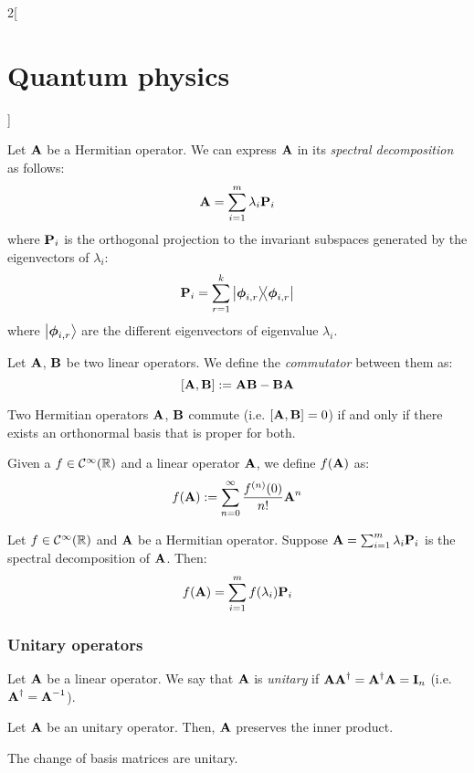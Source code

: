\documentclass[../../../main_physics.tex]{subfiles}
\begin{document}
\begin{multicols}{2}[\section{Quantum physics}]
\begin{definition}
  \end{definition}
  \begin{proposition}
    Let $\boldsymbol{\mathrm{A}}$ be a Hermitian operator. We can express $\boldsymbol{\mathrm{A}}$ in its \emph{spectral decomposition} as follows: $$\boldsymbol{\mathrm{A}}=\sum_{i=1}^m\lambda_i\boldsymbol{\mathrm{P}}_i$$
    where $\boldsymbol{\mathrm{P}}_i$ is the orthogonal projection to the invariant subspaces generated by the eigenvectors of $\lambda_i$: $$\vf{P}_i=\sum_{r=1}^k\dyad{\vf\phi_{i,r}}{\vf\phi_{i,r}}$$
    where $\ket{\boldsymbol{\mathrm{\phi}}_{i,r}}$ are the different eigenvectors of eigenvalue $\lambda_i$.
  \end{proposition}
  \begin{definition}[Commutator]
    Let $\boldsymbol{\mathrm{A}}$, $\boldsymbol{\mathrm{B}}$ be two linear operators. We define the \emph{commutator} between them as: $$[\boldsymbol{\mathrm{A}},\boldsymbol{\mathrm{B}}]:=\boldsymbol{\mathrm{AB}}-\boldsymbol{\mathrm{BA}}$$
  \end{definition}
  \begin{theorem}
    Two Hermitian operators $\boldsymbol{\mathrm{A}}$, $\boldsymbol{\mathrm{B}}$ commute (i.e. $[\boldsymbol{\mathrm{A}},\boldsymbol{\mathrm{B}}]=0$) if and only if there exists an orthonormal basis that is proper for both.
  \end{theorem}
  \begin{definition}
    Given a $f\in\mathcal{C}^\infty(\mathbb{R})$ and a linear operator $\boldsymbol{\mathrm{A}}$, we define $f(\boldsymbol{\mathrm{A}})$ as: $$f(\boldsymbol{\mathrm{A}}):=\sum_{n=0}^\infty \frac{f^{(n)}(0)}{n!}\boldsymbol{\mathrm{A}}^n$$
  \end{definition}
  \begin{proposition}
    Let $f\in\mathcal{C}^\infty(\mathbb{R})$ and $\boldsymbol{\mathrm{A}}$ be a Hermitian operator. Suppose $\boldsymbol{\mathrm{A}}=\sum_{i=1}^m\lambda_i\boldsymbol{\mathrm{P}}_i$ is the spectral decomposition of $\boldsymbol{\mathrm{A}}$. Then: $$f(\boldsymbol{\mathrm{A}})=\sum_{i=1}^mf(\lambda_i)\boldsymbol{\mathrm{P}}_i$$
  \end{proposition}
  \subsubsection{Unitary operators}
  \begin{definition}
    Let $\boldsymbol{\mathrm{A}}$ be a linear operator. We say that $\boldsymbol{\mathrm{A}}$ is \emph{unitary} if $\boldsymbol{\mathrm{A}}\boldsymbol{\mathrm{A}}^\dag=\boldsymbol{\mathrm{A}}^\dag\boldsymbol{\mathrm{A}}=\boldsymbol{\mathrm{I}}_n$ (i.e. $\boldsymbol{\mathrm{A}}^\dag=\boldsymbol{\mathrm{A}}^{-1}$).
  \end{definition}
  \begin{proposition}
    Let $\boldsymbol{\mathrm{A}}$ be an unitary operator. Then, $\boldsymbol{\mathrm{A}}$ preserves the inner product.
  \end{proposition}
  \begin{proposition}
    The change of basis matrices are unitary.
  \end{proposition}

\end{multicols}
\end{document}
